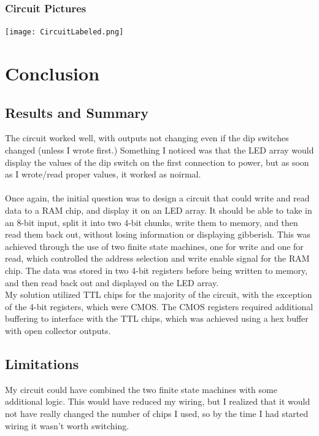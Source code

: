 \documentclass{article}
\begin{document}
        \subsubsection{Circuit Pictures}
        \texttt{[image: CircuitLabeled.png]}

    \section{Conclusion}  

        \subsection{Results and Summary} 
        The circuit worked well, with outputs not changing even if the dip switches changed (unless I wrote first.) 
        Something I noticed was that the LED array would display the values of the dip switch on the first connection to power, but as soon as I 
        wrote/read proper values, it worked as noirmal. \\\\
        Once again, the initial question was to design a circuit that could write and read data to a RAM chip, and display it on an LED array. It should be able to take in an 8-bit input, split it into two 4-bit chunks, write them to memory, and then read them back out,
        without losing information or displaying gibberish. This was achieved through the use of two finite state machines, one for write and one for read, which controlled the address selection and write enable signal for the RAM chip. The data was stored in two 4-bit registers before being written to memory, and then read back out and displayed on the LED array.\\

    
        My solution utilized TTL chips for the majority of the circuit, with the exception of the 4-bit registers, which were CMOS. The CMOS registers required additional buffering to interface with the TTL chips, which was achieved using a hex buffer with open collector outputs.\\
        
        \subsection{Limitations}

        My circuit could have combined the two finite state machines with some additional logic. This would have reduced my wiring, but I realized 
        that it would not have really changed the number of chips I used, so by the time I had started wiring it wasn't worth switching.\\
\end{document}
